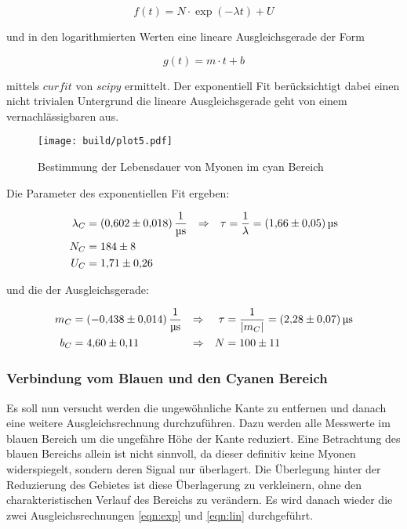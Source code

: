 \begin{equation}
	f(t)=N \cdot \exp(-\lambda t) + U
	\label{eqn:exp}
\end{equation}

und in den logarithmierten Werten eine lineare Ausgleichsgerade der Form

\begin{equation}
	g(t)=m \cdot t +b
	\label{eqn:lin}
\end{equation}

mittels $curfit$ von $scipy$ ermittelt. 
Der exponentiell Fit berücksichtigt dabei einen nicht trivialen Untergrund die lineare Ausgleichsgerade geht von einem vernachlässigbaren aus. 

\begin{figure}[H]
	\centering
	\texttt{[image: build/plot5.pdf]}
	\caption{Bestimmung der Lebensdauer von Myonen im cyan Bereich}\label{fig:plt5}
\end{figure}

Die Parameter des exponentiellen Fit ergeben:

\begin{align}
	\lambda_C&=\qty{0.602(0.018)}{\per\us} &\Rightarrow & & \tau&=\frac{1}{\lambda }=\qty{1.66(0.05)}{\us} \\
	N_C&=\num{184(8)} \notag \\
	U_C&=\num{1.71(0.26)} \notag
\end{align}

und die der Ausgleichsgerade: 

\begin{align}
	m_C&=\qty{-0.438(0.014)}{\per\us} &\Rightarrow & & \tau&=\frac{1}{|m_C|}=\qty{2.28(0.07)}{\us} \\
	b_C&=\num{4.60(0.11)} &\Rightarrow & & N&=\num{100(11)} \notag
\end{align}

\subsubsection{Verbindung vom Blauen und den Cyanen Bereich}
Es soll nun versucht werden die ungewöhnliche Kante zu entfernen und danach eine weitere Ausgleichsrechnung durchzuführen. 
Dazu werden alle Messwerte im blauen Bereich um die ungefähre Höhe der Kante reduziert. 
Eine Betrachtung des blauen Bereichs allein ist nicht sinnvoll, da dieser definitiv keine Myonen widerspiegelt, sondern deren Signal nur überlagert. 
Die Überlegung hinter der Reduzierung des Gebietes ist diese Überlagerung zu verkleinern, ohne den charakteristischen Verlauf des Bereichs zu verändern. 
Es wird danach wieder die zwei Ausgleichsrechnungen \eqref{eqn:exp} und \eqref{eqn:lin} durchgeführt. 

